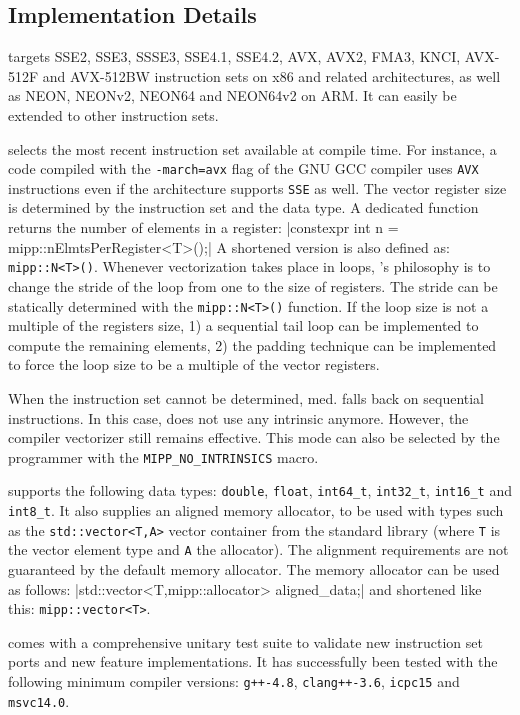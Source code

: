 \subsection{Implementation Details}
\label{sec:opt_mipp_implem}

\MIPP targets SSE2, SSE3, SSSE3, SSE4.1, SSE4.2, AVX, AVX2, FMA3, KNCI, AVX-512F
and AVX-512BW instruction sets on x86 and related architectures, as well as
NEON, NEONv2, NEON64 and NEON64v2 on ARM\R. It can easily be extended to other
instruction sets.

\MIPP selects the most recent instruction set available at compile time. For
instance, a code compiled with the \verb|-march=avx| flag of the GNU GCC
compiler uses \verb|AVX| instructions even if the architecture supports
\verb|SSE| as well. The vector register size is determined by the instruction
set and the data type. A dedicated function returns the number of elements in a
\MIPP register:
|constexpr int n = mipp::nElmtsPerRegister<T>();|
{\noindent
A shortened version is also defined as: \verb|mipp::N<T>()|. Whenever
vectorization takes place in loops, \MIPP's philosophy is to change the stride
of the loop from one to the size of registers. The stride can be statically
determined with the \verb|mipp::N<T>()| function.
If the loop size is not a multiple of the registers size, 1) a sequential tail
loop can be implemented to compute the remaining elements, 2) the padding
technique can be implemented to force the loop size to be a multiple of the
vector registers.
}

When the instruction set cannot be determined, \MIPP med. falls back on
sequential instructions. In this case, \MIPP does not use any intrinsic anymore.
However, the compiler vectorizer still remains effective. This mode can also be
selected by the programmer with the \verb|MIPP_NO_INTRINSICS| macro.

\MIPP supports the following data types: \verb|double|, \verb|float|,
\verb|int64_t|, \verb|int32_t|, \verb|int16_t| and \verb|int8_t|. It also
supplies an aligned memory allocator, to be used with types such as the
\verb|std::vector<T,A>| vector container from the \Cxx standard library (where
\verb|T| is the vector element type and \verb|A| the allocator). The alignment
requirements are not guaranteed by the default \Cxx memory allocator. The \MIPP
memory allocator can be used as follows:
|std::vector<T,mipp::allocator> aligned_data;|
{\noindent
and shortened like this: \verb|mipp::vector<T>|.
}

\MIPP comes with a comprehensive unitary test suite to validate new instruction
set ports and new feature implementations. It has successfully been tested with
the following minimum compiler versions: \verb|g++-4.8|, \verb|clang++-3.6|,
\verb|icpc15| and \verb|msvc14.0|.

